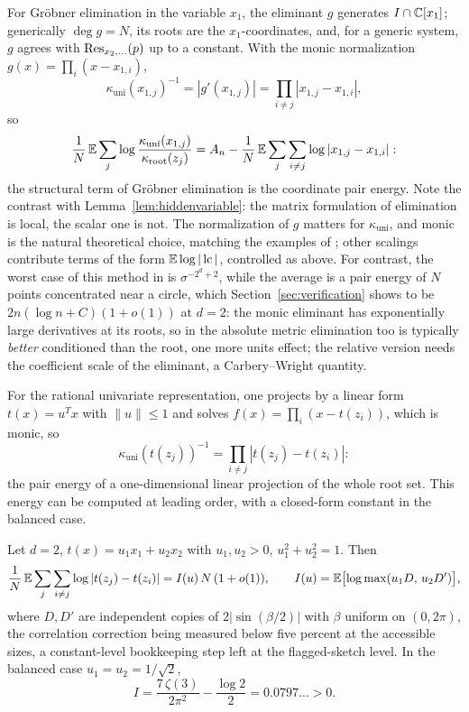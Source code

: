 For Gr\"obner elimination in the variable $x_1$, the eliminant $g$ generates
$I\cap\mathbb{C}[x_1]$; generically $\deg g = N$, its roots are the $x_1$-coordinates, and, for a
generic system, $g$ agrees with $\operatorname{Res}_{x_2,\dots}(p)$ up to a constant. With the monic
normalization $g(x) = \prod_i(x-x_{1,i})$,
\[
  \kappa_{\mathrm{uni}}(x_{1,j})^{-1} = |g'(x_{1,j})| = \prod_{i\ne j}|x_{1,j}-x_{1,i}|,
\]
so
\[
  \frac1N\,\mathbb{E}\sum_j\log\frac{\kappa_{\mathrm{uni}}(x_{1,j})}{\kappa_{\mathrm{root}}(z_j)}
  = A_n - \frac1N\,\mathbb{E}\sum_j\sum_{i\ne j}\log|x_{1,j}-x_{1,i}|:
\]
the structural term of Gr\"obner elimination is the coordinate pair energy. Note the
contrast with Lemma~\ref{lem:hiddenvariable}: the matrix formulation of elimination is
local, the scalar one is not. The normalization of $g$ matters for
$\kappa_{\mathrm{uni}}$, and monic is the natural theoretical choice, matching the
examples of \cite{graf2026numerical}; other scalings contribute terms of the form
$\mathbb{E}\log|\operatorname{lc}|$, controlled as above. For contrast, the worst case of this method in
\cite[Ex.~3.1]{graf2026numerical} is $\sigma^{-2^d+2}$, while the average is a pair energy
of $N$ points concentrated near a circle, which Section~\ref{sec:verification} shows to be
$2n(\log n+C)(1+o(1))$ at $d=2$: the monic eliminant has exponentially large derivatives
at its roots, so in the absolute metric elimination too is typically \emph{better}
conditioned than the root, one more units effect; the relative version needs the
coefficient scale of the eliminant, a Carbery--Wright quantity.

For the rational univariate representation, one projects by a linear form
$t(x) = u^Tx$ with $\|u\|\le1$ and solves $f(x) = \prod_i(x-t(z_i))$, which is monic, so
\[
  \kappa_{\mathrm{uni}}(t(z_j))^{-1} = \prod_{i\ne j}|t(z_j)-t(z_i)|:
\]
the pair energy of a one-dimensional linear projection of the whole root set. This energy
can be computed at leading order, with a closed-form constant in the balanced case.

\begin{proposition}\label{prop:rur}
  Let $d=2$, $t(x) = u_1x_1+u_2x_2$ with $u_1,u_2>0$, $u_1^2+u_2^2 = 1$. Then
  \[
    \frac1N\,\mathbb{E}\sum_j\sum_{i\ne j}\log|t(z_j)-t(z_i)| = I(u)\,N\,(1+o(1)),
    \qquad I(u) = \mathbb{E}\bigl[\log\max(u_1D,\,u_2D')\bigr],
  \]
  where $D,D'$ are independent copies of $2|\sin(\beta/2)|$ with $\beta$ uniform on
  $(0,2\pi)$, the correlation correction being measured below five percent at the
  accessible sizes, a constant-level bookkeeping step left at the flagged-sketch level. In
  the balanced case $u_1=u_2=1/\sqrt2$,
  \[
    I = \frac{7\,\zeta(3)}{2\pi^2} - \frac{\log2}2 = 0.0797\ldots > 0.
  \]
\end{proposition}

